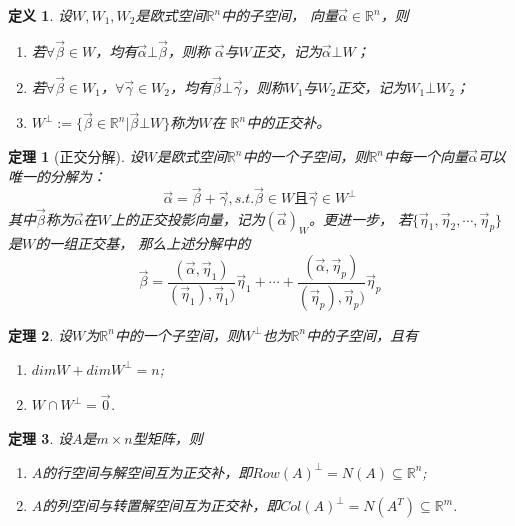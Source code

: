 \documentclass[a4paper]{book}
\newtheorem{Def}{定义}[chapter]
\newtheorem{thm}{定理}[chapter]
\begin{document}
\begin{Def}
设$W,W_1,W_2$是欧式空间$\mathbb{R}^{n}$中的子空间，
向量$\vec{\alpha}\in\mathbb{R}^n$，则
\begin{enumerate}
  \item 若$\forall\vec{\beta}\in W$，均有$\vec{\alpha}\bot\vec{\beta}$，则称
        $\vec{\alpha}$与$W$正交，记为$\vec{\alpha}\bot W$；
  \item 若$\forall\vec{\beta}\in W_1$，$\forall\vec{\gamma}\in W_2$，均有$\vec{\beta}\bot\vec{\gamma}$，则称$W_1$与$W_2$正交，记为$W_1\bot W_2$；
  \item $W^{\bot}:=\{\vec{\beta}\in\mathbb{R}^n|\vec{\beta}\bot W\}$称为$W$在
       $\mathbb{R}^n$中的正交补。
\end{enumerate}
\end{Def}

\begin{thm}
[正交分解]设$W$是欧式空间$\mathbb{R}^n$中的一个子空间，则$\mathbb{R}^n$中每一个向量$\vec{\alpha}$可以唯一的分解为：
\begin{equation*}
\vec{\alpha}=\vec{\beta}+\vec{\gamma},s.t.\vec{\beta}\in W\text{且}\vec{\gamma}\in W^{\bot}
\end{equation*}
其中$\vec{\beta}$称为$\vec{\alpha}$在$W$上的正交投影向量，记为$(\vec{\alpha})_{W}$。更进一步，
若$\{\vec{\eta}_1,\vec{\eta}_2,\cdots,\vec{\eta}_p\}$
是$W$的一组正交基，
那么上述分解中的
\begin{equation*}
\vec{\beta}=\frac{(\vec{\alpha},\vec{\eta}_1)}{(\vec{\eta}_1),\vec{\eta}_1)}\vec{\eta}_1
+\cdots+\frac{(\vec{\alpha},\vec{\eta}_p)}{(\vec{\eta}_p),\vec{\eta}_p)}\vec{\eta}_p
\end{equation*}
\end{thm}

\begin{thm}
设$W$为$\mathbb{R}^n$中的一个子空间，则$W^{\bot}$也为$\mathbb{R}^n$中的子空间，且有
\begin{enumerate}
  \item $dimW+dimW^{\bot}=n$;
  \item $W\cap W^{\bot}={\vec{0}}$.
\end{enumerate}
\end{thm}

\begin{thm}
设$A$是$m\times n$型矩阵，则
\begin{enumerate}
  \item $A$的行空间与解空间互为正交补，即$Row(A)^{\bot}=N(A)\subseteq\mathbb{R}^n$;
  \item $A$的列空间与转置解空间互为正交补，即$Col(A)^{\bot}=N(A^T)\subseteq\mathbb{R}^m$.
\end{enumerate}
\end{thm}
\end{document}
